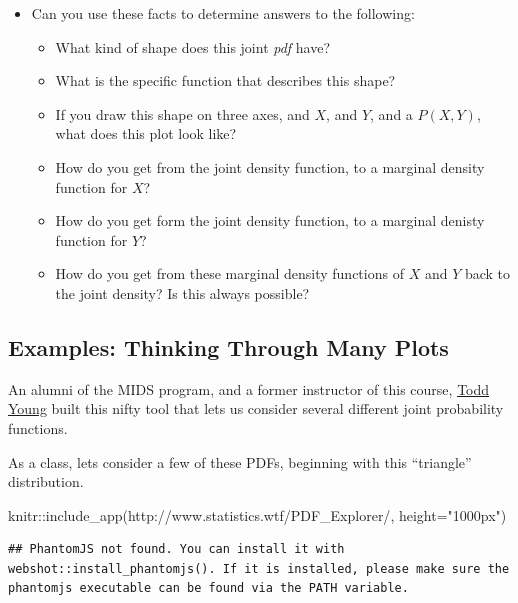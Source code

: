\documentclass[
]{book}
\newenvironment{Shaded}{\begin{snugshade}}{\end{snugshade}}
\newcommand{\AttributeTok}[1]{\textcolor[rgb]{0.77,0.63,0.00}{#1}}
\newcommand{\FunctionTok}[1]{\textcolor[rgb]{0.00,0.00,0.00}{#1}}
\newcommand{\NormalTok}[1]{#1}
\newcommand{\SpecialCharTok}[1]{\textcolor[rgb]{0.00,0.00,0.00}{#1}}
\newcommand{\StringTok}[1]{\textcolor[rgb]{0.31,0.60,0.02}{#1}}
\providecommand{\tightlist}{%
  \setlength{\itemsep}{0pt}\setlength{\parskip}{0pt}}
\theoremstyle{definition}
\theoremstyle{definition}
\theoremstyle{definition}
\theoremstyle{definition}
\theoremstyle{remark}
\begin{document}
\begin{itemize}
\tightlist
\item
  Can you use these facts to determine answers to the following:

  \begin{itemize}
  \tightlist
  \item
    What kind of shape does this joint \emph{pdf} have?
  \item
    What is the specific function that describes this shape?
  \item
    If you draw this shape on three axes, and \(X\), and \(Y\), and a \(P(X,Y)\), what does this plot look like?
  \item
    How do you get from the joint density function, to a marginal density function for \(X\)?
  \item
    How do you get form the joint density function, to a marginal denisty function for \(Y\)?
  \item
    How do you get from these marginal density functions of \(X\) and \(Y\) back to the joint density? Is this always possible?
  \end{itemize}
\end{itemize}

\hypertarget{examples-thinking-through-many-plots}{%
\subsection{Examples: Thinking Through Many Plots}\label{examples-thinking-through-many-plots}}

An alumni of the MIDS program, and a former instructor of this course, \href{https://www.linkedin.com/in/dtoddyoung/}{Todd Young} built this nifty tool that lets us consider several different joint probability functions.

As a class, lets consider a few of these PDFs, beginning with this ``triangle'' distribution.

\begin{Shaded}
\begin{Highlighting}[]
\NormalTok{knitr}\SpecialCharTok{::}\FunctionTok{include\_app}\NormalTok{(}\StringTok{\textquotesingle{}http://www.statistics.wtf/PDF\_Explorer/\textquotesingle{}}\NormalTok{, }\AttributeTok{height=}\StringTok{"1000px"}\NormalTok{)}
\end{Highlighting}
\end{Shaded}

\begin{verbatim}
## PhantomJS not found. You can install it with webshot::install_phantomjs(). If it is installed, please make sure the phantomjs executable can be found via the PATH variable.
\end{verbatim}
\end{document}
